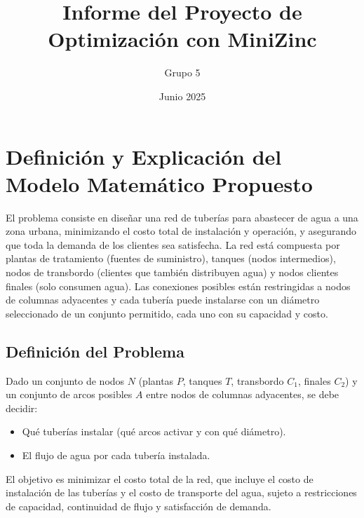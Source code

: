 \documentclass[a4paper,12pt]{article}
\title{Informe del Proyecto de Optimización con MiniZinc}
\author{Grupo 5}
\date{Junio 2025}
\begin{document}
\maketitle


\section{Definición y Explicación del Modelo Matemático Propuesto}

El problema consiste en diseñar una red de tuberías para abastecer de agua a una zona urbana, minimizando el costo total de instalación y operación, y asegurando que toda la demanda de los clientes sea satisfecha. La red está compuesta por plantas de tratamiento (fuentes de suministro), tanques (nodos intermedios), nodos de transbordo (clientes que también distribuyen agua) y nodos clientes finales (solo consumen agua). Las conexiones posibles están restringidas a nodos de columnas adyacentes y cada tubería puede instalarse con un diámetro seleccionado de un conjunto permitido, cada uno con su capacidad y costo.

\subsection{Definición del Problema}

Dado un conjunto de nodos $N$ (plantas $P$, tanques $T$, transbordo $C_1$, finales $C_2$) y un conjunto de arcos posibles $A$ entre nodos de columnas adyacentes, se debe decidir:
\begin{itemize}
    \item Qué tuberías instalar (qué arcos activar y con qué diámetro).
    \item El flujo de agua por cada tubería instalada.
\end{itemize}

El objetivo es minimizar el costo total de la red, que incluye el costo de instalación de las tuberías y el costo de transporte del agua, sujeto a restricciones de capacidad, continuidad de flujo y satisfacción de demanda.
\end{document}

